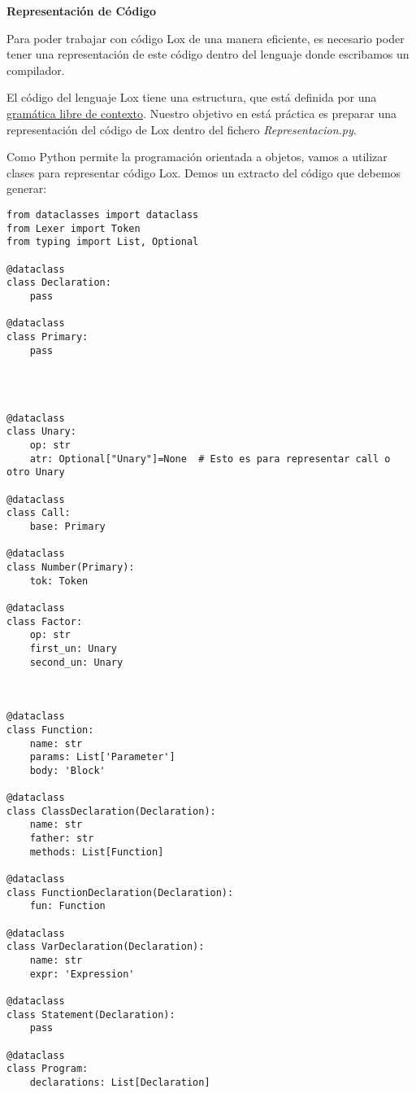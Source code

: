 
\author{Helmut Krauser}
\date{\today}
\title{}


\vspace{5mm}\centerline{\large\bf Representación de Código}\vspace{5mm}
\label{sec:orga46933b}

Para poder trabajar con código Lox de una manera eficiente, es necesario poder 
tener una representación de este código dentro del lenguaje donde escribamos un compilador.

El código del lenguaje Lox tiene una estructura, que está definida por una \href{https://craftinginterpreters.com/appendix-i.html}{gramática libre de contexto}.
Nuestro objetivo en está práctica es preparar una representación del código de Lox dentro del fichero \emph{Representacion.py}.

Como Python permite la programación orientada a objetos, vamos a utilizar clases para representar código Lox.
Demos un extracto del código que debemos generar:
\begin{verbatim}
from dataclasses import dataclass
from Lexer import Token
from typing import List, Optional

@dataclass
class Declaration:
    pass

@dataclass
class Primary:
    pass




@dataclass
class Unary:
    op: str
    atr: Optional["Unary"]=None  # Esto es para representar call o otro Unary

@dataclass
class Call:
    base: Primary

@dataclass
class Number(Primary):
    tok: Token

@dataclass
class Factor:
    op: str
    first_un: Unary
    second_un: Unary

            

@dataclass
class Function:
    name: str
    params: List['Parameter']
    body: 'Block'

@dataclass
class ClassDeclaration(Declaration):
    name: str
    father: str
    methods: List[Function]

@dataclass
class FunctionDeclaration(Declaration):
    fun: Function

@dataclass
class VarDeclaration(Declaration):
    name: str
    expr: 'Expression'

@dataclass
class Statement(Declaration):
    pass

@dataclass
class Program:
    declarations: List[Declaration]


\end{verbatim}

